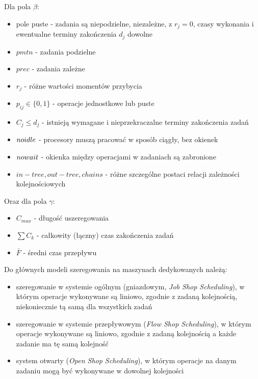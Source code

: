 \documentclass[brudnopis]{xmgr}
\begin{document}
Dla pola $\beta$:
\begin{itemize}
    \item pole puste - zadania są niepodzielne, niezależne, z $r_j=0$, czasy wykonania i ewentualne terminy zakończenia $d_j$ dowolne
    \item $pmtn$ - zadania podzielne
    \item $prec$ - zadania zależne
    \item $r_j$ - różne wartości momentów przybycia
    \item $p_{ij}\in\{0,1\}$ - operacje jednostkowe lub puste
    \item $C_j\leq d_j$ - istnieją wymagane i nieprzekraczalne terminy zakończenia zadań
    \item $no\-idle$ - procesory muszą pracować w sposób ciągły, bez okienek
    \item $no\-wait$ - okienka między operacjami w zadaniach są zabronione
    \item $in-tree, out-tree, chains$ - różne szczególne postaci relacji zależności kolejnościowych
\end{itemize}

Oraz dla pola $\gamma$:
\begin{itemize}
    \item $C_{max}$ - długość uszeregowania
    \item $\sum{C_k}$ - całkowity (łączny) czas zakończenia zadań
    \item $\bar{F}$ - średni czas przepływu
\end{itemize}


Do głównych modeli szeregowania na maszynach dedykowanych należą:
\begin{itemize}
    \item szeregowanie w systemie ogólnym (gniazdowym, \emph{Job Shop Scheduling}), w którym operacje wykonywane są liniowo, zgodnie z zadaną kolejnością, niekoniecznie tą samą dla wszystkich zadań
    \item szeregowanie w systemie przepływowym (\emph{Flow Shop Scheduling}), w którym operacje wykonywane są liniowo, zgodnie z zadaną kolejnością a każde zadanie ma tę samą kolejność
    \item system otwarty (\emph{Open Shop Scheduling}), w którym operacje na danym zadaniu mogą być wykonywane w dowolnej kolejności
\end{itemize}
\end{document}
